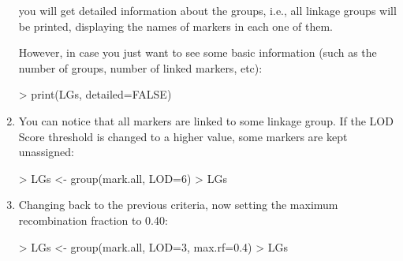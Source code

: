 \documentclass[letterpaper,12pt,oneside]{article}
\begin{document}
\begin{enumerate}
you will get detailed information about the groups, i.e., all linkage groups will be printed, displaying the names of markers in each one of them.

However, in case you just want to see some basic information (such as the number of groups, number of linked markers, etc):
\begin{Schunk}
\begin{Sinput}
> print(LGs, detailed=FALSE)
\end{Sinput}
\end{Schunk}

\item You can notice that all markers are linked to some linkage group. If the LOD Score threshold is changed to a higher value, some markers are kept unassigned:
\begin{Schunk}
\begin{Sinput}
> LGs <- group(mark.all, LOD=6)
> LGs
\end{Sinput}
\end{Schunk}

\item Changing back to the previous criteria, now setting the maximum recombination fraction to 0.40:
\begin{Schunk}
\begin{Sinput}
> LGs <- group(mark.all, LOD=3, max.rf=0.4)
> LGs
\end{Sinput}
\end{Schunk}
\end{enumerate}
\end{document}
